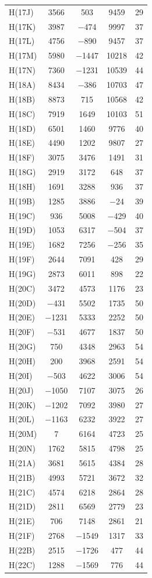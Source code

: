 \begin{center}
{\begin{supertabular}{lcccc}
H(17J)&3566&503&9459&29\\
H(17K)&3987&$-$474&9997&37\\
H(17L)&4756&$-$890&9457&37\\
H(17M)&5980&$-$1447&10218&42\\
H(17N)&7360&$-$1231&10539&44\\
H(18A)&8434&$-$386&10703&47\\
H(18B)&8873&715&10568&42\\
H(18C)&7919&1649&10103&51\\
H(18D)&6501&1460&9776&40\\
H(18E)&4490&1202&9807&27\\
H(18F)&3075&3476&1491&31\\
H(18G)&2919&3172&648&37\\
H(18H)&1691&3288&936&37\\
H(19B)&1285&3886&$-$24&39\\
H(19C)&936&5008&$-$429&40\\
H(19D)&1053&6317&$-$504&37\\
H(19E)&1682&7256&$-$256&35\\
H(19F)&2644&7091&428&29\\
H(19G)&2873&6011&898&22\\
H(20C)&3472&4573&1176&23\\
H(20D)&$-$431&5502&1735&50\\
H(20E)&$-$1231&5333&2252&50\\
H(20F)&$-$531&4677&1837&50\\
H(20G)&750&4348&2963&54\\
H(20H)&200&3968&2591&54\\
H(20I)&$-$503&4622&3006&54\\
H(20J)&$-$1050&7107&3075&26\\
H(20K)&$-$1202&7092&3980&27\\
H(20L)&$-$1163&6232&3922&27\\
H(20M)&7&6164&4723&25\\
H(20N)&1762&5815&4798&25\\
H(21A)&3681&5615&4384&28\\
H(21B)&4993&5721&3672&32\\
H(21C)&4574&6218&2864&28\\
H(21D)&2811&6569&2779&23\\
H(21E)&706&7148&2861&21\\
H(21F)&2768&$-$1549&1317&33\\
H(22B)&2515&$-$1726&477&44\\
H(22C)&1288&$-$1569&776&44\\

\end{supertabular}}
\end{center}
